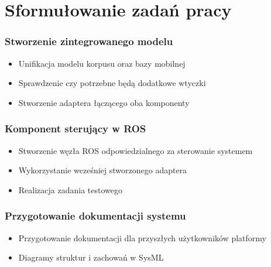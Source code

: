 \section{Sformułowanie zadań pracy}



\begin{frame}
	\frametitle{Stworzenie zintegrowanego modelu}
	\begin{itemize}
		\item Unifikacja modelu korpusu oraz bazy mobilnej
		\item Sprawdzenie czy potrzebne będą dodatkowe wtyczki
		\item Stworzenie adaptera łączącego oba komponenty 
	\end{itemize}
\end{frame}


\begin{frame}
	\frametitle{Komponent sterujący w ROS}
	\begin{itemize}
		\item Stworzenie węzła ROS odpowiedzialnego za sterowanie systemem
		\item Wykorzystanie wcześniej stworzonego adaptera
		\item Realizacja zadania testowego
	\end{itemize}
\end{frame}


\begin{frame}
	\frametitle{Przygotowanie dokumentacji systemu}
	\begin{itemize}
		\item Przygotowanie dokumentacji dla przyszłych użytkowników platformy
		\item Diagramy struktur i zachowań w SysML
	\end{itemize}
\end{frame}

